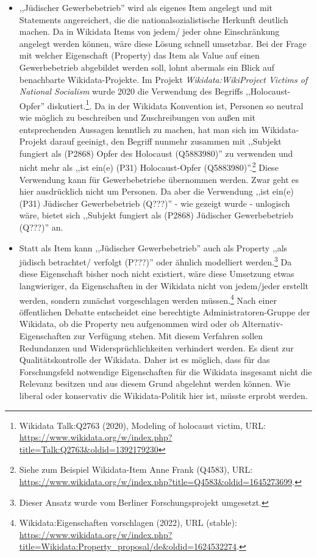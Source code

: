 \begin{itemize}
    \item ,,Jüdischer Gewerbebetrieb'' wird als eigenes Item angelegt und mit Statements angereichert, die die nationalsozialistische Herkunft deutlich machen. Da in Wikidata Items von jedem/ jeder ohne Einschränkung angelegt werden können, wäre diese Lösung schnell umsetzbar. Bei der Frage mit welcher Eigenschaft (Property) das Item als Value auf einen Gewerbebetrieb abgebildet werden soll, lohnt abermals ein Blick auf benachbarte Wikidata-Projekte. Im Projekt \textit{Wikidata:WikiProject Victims of National Socialism} wurde 2020 die Verwendung des Begriffs ,,Holocaust-Opfer'' diskutiert.\footnote{Wikidata Talk:Q2763 (2020), Modeling of holocaust victim, URL: \url{https://www.wikidata.org/w/index.php?title=Talk:Q2763&oldid=1392179230}}. Da in der Wikidata Konvention ist, Personen so neutral wie möglich zu beschreiben und Zuschreibungen von außen mit entsprechenden Aussagen kenntlich zu machen, hat man sich im Wikidata-Projekt darauf geeinigt, den Begriff nunmehr zusammen mit ,,Subjekt fungiert als (P2868) Opfer des Holocaust (Q5883980)'' zu verwenden und nicht mehr als ,,ist ein(e) (P31) Holocaust-Opfer (Q5883980)''.\footnote{Siehe zum Beispiel Wikidata-Item Anne Frank (Q4583), URL: \url{https://www.wikidata.org/w/index.php?title=Q4583&oldid=1645273699}.} Diese Verwendung kann für Gewerbebetriebe übernommen werden. Zwar geht es hier ausdrücklich nicht um Personen. Da aber die Verwendung ,,ist ein(e) (P31) Jüdischer Gewerbebetrieb (Q???)'' - wie gezeigt wurde - unlogisch wäre, bietet sich ,,Subjekt fungiert als (P2868) Jüdischer Gewerbebetrieb (Q???)'' an.
    \item Statt als Item kann ,,Jüdischer Gewerbebetrieb'' auch als Property ,,als jüdisch betrachtet/ verfolgt (P???)'' oder ähnlich modelliert werden.\footnote{Dieser Ansatz wurde vom Berliner Forschungsprojekt umgesetzt.} Da diese Eigenschaft bisher noch nicht existiert, wäre diese Umsetzung etwas langwieriger, da Eigenschaften in der Wikidata nicht von jedem/jeder erstellt werden, sondern zunächst vorgeschlagen werden müssen.\footnote{Wikidata:Eigenschaften vorschlagen (2022), URL (stable): \url{https://www.wikidata.org/w/index.php?title=Wikidata:Property_proposal/de&oldid=1624532274}.} Nach einer öffentlichen Debatte entscheidet eine berechtigte Administratoren-Gruppe der Wikidata, ob die Property neu aufgenommen wird oder ob Alternativ-Eigenschaften zur Verfügung stehen. Mit diesem Verfahren sollen Redundanzen und Widersprüchlichkeiten verhindert werden. Es dient zur Qualitätskontrolle der Wikidata. Daher ist es möglich, dass für das Forschungsfeld notwendige Eigenschaften für die Wikidata insgesamt nicht die Relevanz besitzen und aus diesem Grund abgelehnt werden können. Wie liberal oder konservativ die Wikidata-Politik hier ist, müsste erprobt werden.      
\end{itemize} 


